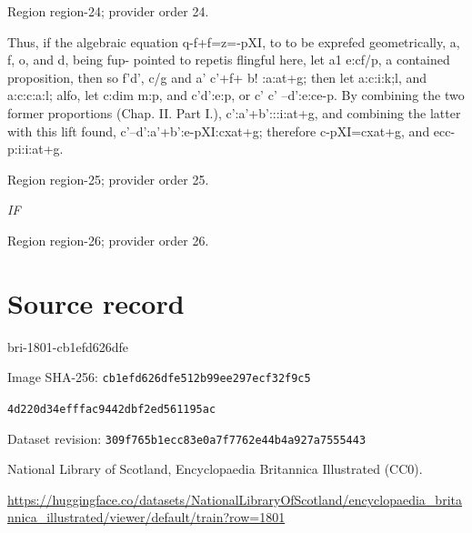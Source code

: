 \documentclass[11pt]{article}
\begin{document}
{\scriptsize\color{gray} Region region-24; provider order 24.\par}
\medskip

Thus, if the algebraic equation q-f+f=z=-pXI, to to be exprefed geometrically, a, f, o, and d, being fup-
pointed to repetis flingful here, let a1 e:cf/p, a contained proposition, then so f'd', c/g and a' c'+f+
b! :a:at+g; then let a:c:i:k;l, and a:c:c:a:l; alfo, let c:dim m:p, and c'd':e:p, or c' c'
--d':e:ce-p. By combining the two former proportions (Chap. II. Part I.), c':a'+b':::i:at+g, and
combining the latter with this lift found, c'--d':a'+b':e-pXI:cxat+g; therefore c-pXI=cxat+g, and
ecc-p:i:i:at+g.
\par

{\scriptsize\color{gray} Region region-25; provider order 25.\par}
\medskip

{\small\itshape IF\par}

{\scriptsize\color{gray} Region region-26; provider order 26.\par}
\medskip
\newpage\section*{Source record}
bri-1801-cb1efd626dfe\par
Image SHA-256: \texttt{cb1efd626dfe512b99ee297ecf32f9c5}\par\texttt{4d220d34efffac9442dbf2ed561195ac}\par
Dataset revision: \texttt{309f765b1ecc83e0a7f7}\texttt{762e44b4a927a7555443}\par
National Library of Scotland, Encyclopaedia Britannica Illustrated (CC0).\par
\url{https://huggingface.co/datasets/NationalLibraryOfScotland/encyclopaedia_britannica_illustrated/viewer/default/train?row=1801}
\end{document}
